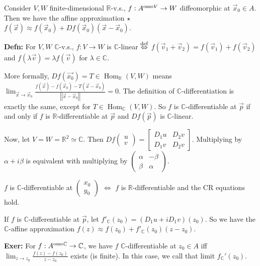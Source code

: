 \documentclass[10pt,letterpaper]{article}
\newcommand{\n}{\hfill\break}
\newcommand{\defn}[1]{\par\noindent\settowidth{\hangindent}{\textbf{Defn: }}\textbf{Defn: }#1\n}
\newcommand{\exer}[1]{\par\noindent\settowidth{\hangindent}{\textbf{Exer: }}\textbf{Exer: }#1\n}
\newcommand{\ptxt}[1]{\textrm{\textnormal{#1}}}
\newcommand{\reals}{\mathbb{R}}
\newcommand{\R}{\reals}
\newcommand{\complex}{\mathbb{C}}
\newcommand{\C}{\complex}
\DeclareMathOperator{\Hom}{Hom}
\newcommand{\abs}[1]{\left|#1\right|}
\newcommand{\norm}[1]{\abs{\abs{#1}}}
\newcommand{\iffdef}{\overset{\ptxt{def}}{\Leftrightarrow}}
\newcommand{\paren}[1]{\left(#1\right)}
\renewcommand{\brack}[1]{\left[#1\right]}
\begin{document}
\par\noindent Consider $V,W$ finite-dimensional $\R$-v.s., $f:A^{\ptxt{osso}V}\to{}W$ diffeomorphic at $\vec{x}_{0}\in{}A$.\n
Then we have the affine approximation $\star$ $f(\vec{x})\approx{}f(\vec{x}_{0})+Df(\vec{x}_{0})(\vec{x}-\vec{x}_{0})$.\n

\defn{For $V,W$ $\C$-v.s., $f:V\to{}W$ is $\C$-linear $\iffdef$ $f(\vec{v}_{1}+\vec{v}_{2})=f(\vec{v}_{1})+f(\vec{v}_{2})$ and $f(\lambda\vec{v})=\lambda{}f(\vec{v})$ for $\lambda\in\C$.}

\par\noindent More formally, $Df(\vec{x_{0}})=T\in\Hom_{\R}(V,W)$ means $\lim_{\vec{x}\to\vec{x}_{0}}\frac{f(\vec{x})-f(\vec{x}_{0})-T(\vec{x}-\vec{x}_{0})}{\norm{\vec{x}-\vec{x}_{0}}}=0$. The definition of $\C$-differentiation is exactly the same, except for $T\in\Hom_{\C}(V,W)$. So $f$ is $\C$-differentiable at $\vec{p}$ if and only if $f$ is $\R$-differentiable at $\vec{p}$ and $Df(\vec{p})$ is $\C$-linear.\n

\par\noindent Now, let $V=W=\R^{2}\simeq\C$. Then $Df\paren{\begin{array}{c}u\\ v\end{array}}=\brack{\begin{array}{cc}D_{1}u & D_{2}v\\ D_{1}v & D_{2}v\end{array}}$. Multiplying by $\alpha+i\beta$ is equivalent with multiplying by $\paren{\begin{array}{cc}\alpha & -\beta\\ \beta & \alpha\end{array}}$.\n

\par\noindent $f$ is $\C$-differentiable at $\paren{\begin{array}{c}x_{0}\\ y_{0}\end{array}}$ $\Leftrightarrow$ $f$ is $\R$-differentiable and the CR equations hold.\n

\par\noindent If $f$ is $\C$-differentiable at $\vec{p}$, let $f'_{\C}(z_{0})=(D_{1}u+iD_{1}v)(z_{0})$.\n
So we have the $\C$-affine approximation $f(z)\approx{}f(z_{0})+f'_{\C}(z_{0})(z-z_{0})$.\n

\exer{For $f:A^{\ptxt{osso}\C}\to\C$, we have $f$ $\C$-differentiable at $z_{0}\in{}A$ iff $\lim_{z\to{}z_{0}}\frac{f(z)-f(z_{0})}{z-z_{0}}$ exists (is finite).\n
In this case, we call that limit $f_{\C}'(z_{0})$.}
\end{document}
